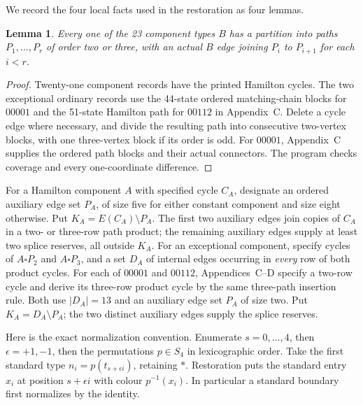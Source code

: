 \documentclass[11pt]{article}
\newtheorem{lemma}[theorem]{Lemma}
\theoremstyle{remark}
\numberwithin{equation}{section}
\numberwithin{table}{section}
\begin{document}
We record the four local facts used in the restoration as four lemmas.

\begin{lemma}\label{lem:pentagon-path-blocks}
Every one of the 23 component types $B$ has a partition into paths
$P_1,\ldots,P_r$ of order two or three, with an actual $B$ edge
joining $P_i$ to $P_{i+1}$ for each $i<r$.
\end{lemma}
\begin{proof}
Twenty-one component records have the printed Hamilton cycles. The two
exceptional ordinary records use the 44-state ordered matching-chain blocks for
$00001$ and the 51-state Hamilton path for $00112$ in Appendix~C.
Delete a cycle edge where necessary, and divide the resulting path
into consecutive two-vertex blocks, with one three-vertex block if
its order is odd. For $00001$, Appendix~C supplies the ordered path blocks and their actual connectors.  The program checks coverage and every one-coordinate difference.
\end{proof}

For a Hamilton component $A$ with specified cycle $C_A$, designate an
ordered auxiliary edge set $P_A$, of size five for either constant
component and size eight otherwise. Put $K_A=E(C_A)\setminus P_A$. The first two
auxiliary edges join copies of $C_A$ in a two- or three-row path product;
the remaining auxiliary edges supply at least two splice reserves, all
outside $K_A$.
For an exceptional component, specify cycles of $A\square P_2$ and
$A\square P_3$, and a set $D_A$ of internal edges occurring in
\emph{every} row of both product cycles. For each of $00001$ and $00112$,
Appendices~C--D specify a two-row cycle and derive its three-row
product cycle by the same three-path insertion rule. Both use $|D_A|=13$
and an auxiliary edge set $P_A$ of size two. Put $K_A=D_A\setminus P_A$; the two
distinct auxiliary edges supply the splice reserves.

Here is the exact normalization convention. Enumerate $s=0,\ldots,4$,
then $\epsilon=+1,-1$, then the permutations $p\in S_4$ in lexicographic
order. Take the first standard type
$n_i=p(t_{s+\epsilon i})$, retaining $\ast$. Restoration puts the
standard entry $x_i$ at position $s+\epsilon i$ with colour $p^{-1}(x_i)$.
In particular a standard boundary first normalizes by the identity.
\end{document}
